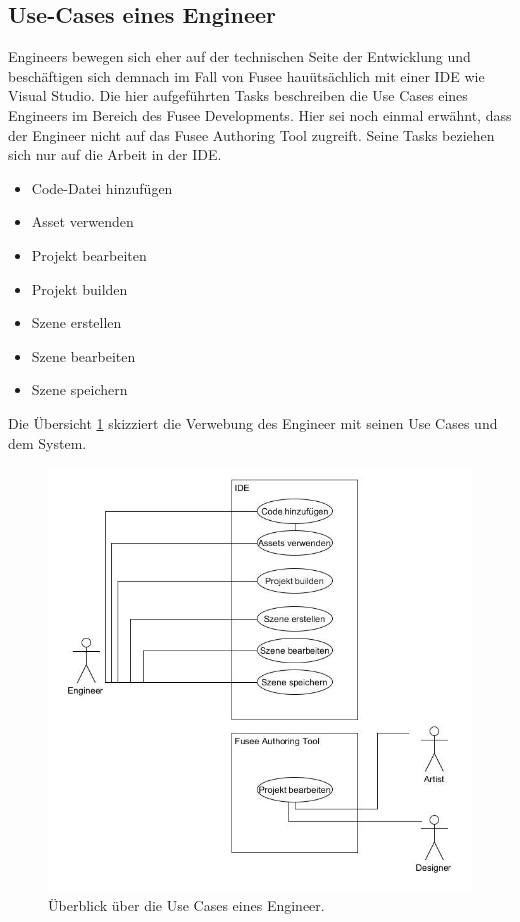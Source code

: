 \documentclass[pagesize, paper=a4, fontsize=12pt, titlepage=true, headings=small, headnosepline, abstractoff, liststotoc, nochapterprefix, plainheadsepline, twoside]{scrreprt}
\begin{document}
\subsection{Use-Cases eines Engineer}
Engineers bewegen sich eher auf der technischen Seite der Entwicklung und beschäftigen sich demnach im Fall von Fusee hauütsächlich mit einer IDE wie Visual Studio. Die hier aufgeführten Tasks beschreiben die Use Cases eines Engineers im Bereich des Fusee Developments. Hier sei noch einmal erwähnt, dass der Engineer nicht auf das Fusee Authoring Tool zugreift. Seine Tasks beziehen sich nur auf die Arbeit in der IDE.

\begin{itemize}
\item Code-Datei hinzufügen
\item Asset verwenden
\item Projekt bearbeiten
\item Projekt builden
\item Szene erstellen
\item Szene bearbeiten
\item Szene speichern
\end{itemize}

Die Übersicht \ref{UseCaseEngineer} skizziert die Verwebung des Engineer mit seinen Use Cases und dem System.
\begin{figure}[ht]
	\centering
	\includegraphics[width=\linewidth]{Bilder/UseCase_Engineer.jpg}
	\caption{Überblick über die Use Cases eines Engineer.}
	\label{UseCaseEngineer}
\end{figure}
\end{document}
